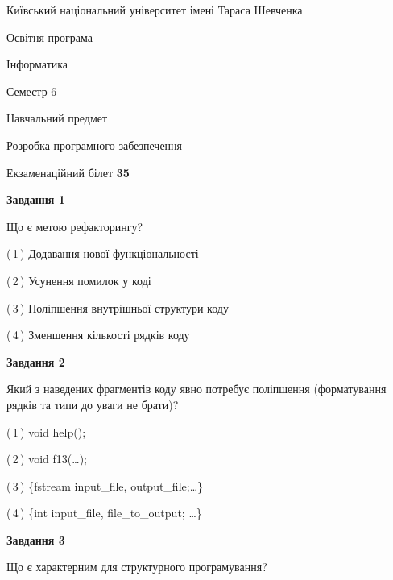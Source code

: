 \documentclass[10pt, ukrainian]{article}
\begin{document}
{{\begin {small}\par
{ \center  Київський національний університет імені Тараса Шевченка \par}
{\parbox {5 cm}{Освітня програма \hfill}{\parbox {7 cm}{Інформатика \hfill}}\parbox {6 cm}{\hfill Семестр 6}}\par
{\parbox {5 cm} {Навчальний предмет \hfill}\parbox {7 cm}{Розробка програмного забезпечення \hfill}\parbox {6cm}{\hfill}\par}\vspace{-7pt} \end{small}}{\center Екзаменаційний білет \No \textbf
{ 35 }\par}}
{
\begin {large}
{\begin {center}\textbf{Завдання 1}\end {center}}\par
Що є метою рефакторингу?\par
\vspace{2mm}



(\,1\,) Додавання нової функціональності%



(\,2\,) Усунення помилок у коді%



(\,3\,) Поліпшення внутрішньої структури коду%



(\,4\,) Зменшення кількості рядків коду%


{\begin {center}\textbf{Завдання 2}\end {center}}\par
Який з наведених фрагментів коду явно потребує поліпшення (форматування рядків та типи до уваги не брати)?\par
\vspace{2mm}



(\,1\,) void help();%



(\,2\,) void f13(…);%



(\,3\,) \{fstream input\_file, output\_file;…\} %



(\,4\,) \{int input\_file, file\_to\_output; …\}%


{\begin {center}\textbf{Завдання 3}\end {center}}\par
Що є характерним для структурного програмування?\par
\vspace{2mm}




\end{large}}
\end{document}
